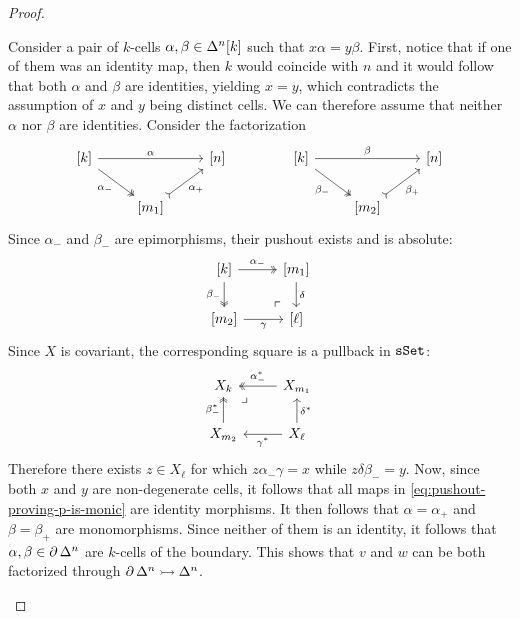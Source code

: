 \begin{proof}
\begin{itemize}
\begin{enumerate}[(i)]
  Consider a pair of \(k\)-cells \(\alpha, \beta \in \Delta^n[k]\) such that
  \(x \alpha = y \beta\). First, notice that if one of them was an identity map,
  then \(k\) would coincide with \(n\) and it would follow that both \(\alpha\)
  and \(\beta\) are identities, yielding \(x = y\), which contradicts the
  assumption of \(x\) and \(y\) being distinct cells. We can therefore assume
  that neither \(\alpha\) nor \(\beta\) are identities. Consider the
  factorization
  \[
  \begin{tikzcd}
  {[k]} \ar[rr, "\alpha"]
  \ar[rd, two heads, "\alpha_{-}"']
  &&{[n]} \\
  &{[m_1]} \ar[ru, tail, "\alpha_{+}"'] &
  \end{tikzcd}
  \qquad
  \qquad
  \begin{tikzcd}
  {[k]} \ar[rr, "\beta"]
  \ar[rd, two heads, "\beta_{-}"']
  & &{[n]}
  \\
  &{[m_2]} \ar[ru, tail, "\beta_{+}"'] &
  \end{tikzcd}
  \]
  Since \(\alpha_{-}\) and \(\beta_{-}\) are epimorphisms, their pushout exists
  and is absolute:
  \begin{equation}\label{eq:pushout-proving-p-is-monic}
  \begin{tikzcd}
  {[k]} \ar[r, "\alpha_{-}", two heads]
  \ar[d, two heads, "\beta_{-}"']
  \ar[dr, phantom, very near end, "\ulcorner"]
  &{[m_1]} \ar[d, "\delta"] \\
  {[m_2]} \ar[r, "\gamma"']
  &{[\ell]}
  \end{tikzcd}
  \end{equation}
  Since \(X\) is covariant, the corresponding square is a pullback in \({\texttt{sSet}}\):
  \[
  \begin{tikzcd}
  X_k
  \ar[dr, phantom, very near start, "\lrcorner"]
  &X_{m_1} \ar[l, "\alpha_{-}^{*}"', two heads] \\
  X_{m_2}
  \ar[u, two heads, "\beta_{-}^{*}"]
  &X_{\ell} \ar[l, "\gamma^{*}"]
  \ar[u, "\delta^{*}"']
  \end{tikzcd}
  \]
  Therefore there exists \(z \in X_{\ell}\) for which
  \(z \alpha_{-} \gamma = x\) while \(z \delta \beta_{-} = y\). Now, since both
  \(x\) and \(y\) are non-degenerate cells, it follows that all maps in
  \cref{eq:pushout-proving-p-is-monic} are identity morphisms. It then follows
  that \(\alpha = \alpha_{+}\) and \(\beta = \beta_{+}\) are
  monomorphisms. Since neither of them is an identity, it follows that
  \(\alpha, \beta \in \operatorname{\partial} \Delta^n\) are \(k\)-cells of the boundary. This shows
  that \(v\) and \(w\) can be both factorized through
  \(\operatorname{\partial} \Delta^n \rightarrowtail \Delta^n\).
  \end{enumerate}
\end{itemize}
\end{proof}

